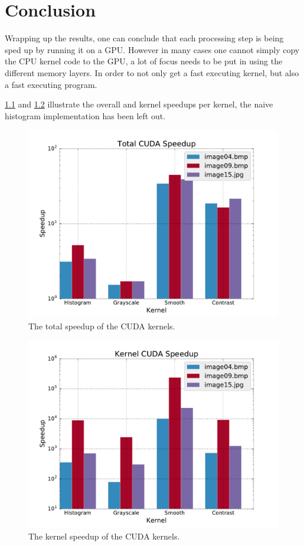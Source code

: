 \documentclass[final]{report}
\begin{document}
\chapter{Conclusion}

Wrapping up the results, one can conclude that each processing step is being sped up by running it on a GPU.
However in many cases one cannot simply copy the CPU kernel code to the GPU, a lot of focus needs to be put in using the different memory layers.
In order to not only get a fast executing kernel, but also a fast executing program.

\cref{fig:total-cuda-speedup} and \cref{fig:kernel-cuda-speedup} illustrate the overall and kernel speedups per kernel, the naive histogram implementation has been left out.

\begin{figure}[H]
\centering
    \includegraphics[width=\linewidth]{resources/total-cuda-speedup-shared.pdf}
    \caption{The total speedup of the CUDA kernels.}
    \label{fig:total-cuda-speedup}
\end{figure}

\begin{figure}[H]
\centering
    \includegraphics[width=\linewidth]{resources/kernel-cuda-speedup-shared.pdf}
    \caption{The kernel speedup of the CUDA kernels.}
    \label{fig:kernel-cuda-speedup}
\end{figure}
\end{document}
